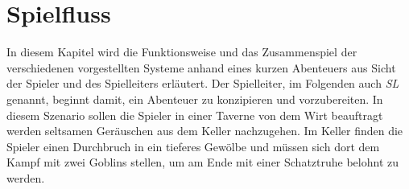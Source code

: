 \section{Spielfluss}
\label{sec:Spielfluss}

In diesem Kapitel wird die Funktionsweise und das Zusammenspiel der verschiedenen vorgestellten Systeme anhand eines kurzen Abenteuers aus Sicht der Spieler und des Spielleiters erläutert.\newline
Der Spielleiter, im Folgenden auch \emph{SL} genannt, beginnt damit, ein Abenteuer zu konzipieren und vorzubereiten. In diesem Szenario sollen die Spieler in einer Taverne von dem Wirt beauftragt werden seltsamen Geräuschen aus dem Keller nachzugehen. Im Keller finden die Spieler einen Durchbruch in ein tieferes Gewölbe und müssen sich dort dem Kampf mit zwei Goblins stellen, um am Ende mit einer Schatztruhe belohnt zu werden.\newline

